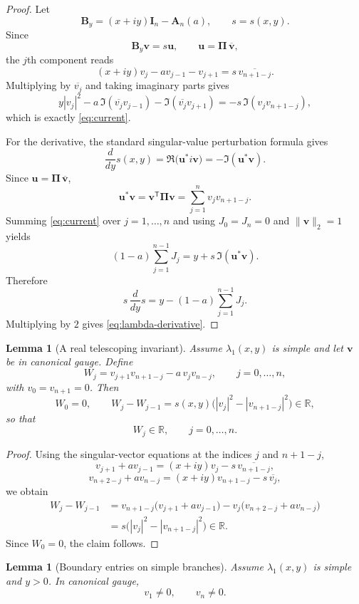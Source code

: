 \documentclass[11pt]{article}
\numberwithin{equation}{section}
\newtheorem{lemma}[theorem]{Lemma}
\begin{document}
\begin{proof}
Let
\[
\mathbf B_y=(x+iy)\mathbf I_n-\mathbf A_n(a),
\qquad
s=s(x,y).
\]
Since
\[
\mathbf B_y\bm v=s\bm u,
\qquad
\bm u=\bm{\Pi}\,\overline{\bm v},
\]
the $j$th component reads
\[
(x+iy)v_j-av_{j-1}-v_{j+1}
=
s\,\overline{v_{n+1-j}}.
\]
Multiplying by $\overline{v_j}$ and taking imaginary parts gives
\[
y|v_j|^2-a\,\Im(\overline{v_j}v_{j-1})-\Im(\overline{v_j}v_{j+1})
=
-s\,\Im(v_jv_{n+1-j}),
\]
which is exactly \eqref{eq:current}.

For the derivative, the standard singular-value perturbation formula gives
\[
\frac{d}{dy}s(x,y)
=
\Re\!\bigl(\bm u^* i\bm v\bigr)
=
-\Im(\bm u^*\bm v).
\]
Since $\bm u=\bm{\Pi}\,\overline{\bm v}$,
\[
\bm u^*\bm v
=
\bm v^{\mathsf T}\bm{\Pi}\bm v
=
\sum_{j=1}^n v_jv_{n+1-j}.
\]
Summing \eqref{eq:current} over $j=1,\dots,n$ and using $J_0=J_n=0$ and
$\|\bm v\|_2=1$ yields
\[
(1-a)\sum_{j=1}^{n-1}J_j
=
y+s\,\Im(\bm u^*\bm v).
\]
Therefore
\[
s\,\frac{d}{dy}s
=
y-(1-a)\sum_{j=1}^{n-1}J_j.
\]
Multiplying by $2$ gives \eqref{eq:lambda-derivative}.
\end{proof}

\begin{lemma}[A real telescoping invariant]\label{lem:W}
Assume $\lambda_1(x,y)$ is simple and let $\bm v$ be in canonical gauge.
Define
\[
W_j=v_{j+1}v_{n+1-j}-a\,v_jv_{n-j},
\qquad
j=0,\dots,n,
\]
with $v_0=v_{n+1}=0$.  Then
\[
W_0=0,
\qquad
W_j-W_{j-1}
=
s(x,y)\bigl(|v_j|^2-|v_{n+1-j}|^2\bigr)\in\mathbb{R},
\]
so that
\[
W_j\in\mathbb{R},\qquad j=0,\dots,n.
\]
\end{lemma}

\begin{proof}
Using the singular-vector equations at the indices $j$ and $n+1-j$,
\[
v_{j+1}+av_{j-1}=(x+iy)v_j-s\,\overline{v_{n+1-j}},
\]
\[
v_{n+2-j}+av_{n-j}=(x+iy)v_{n+1-j}-s\,\overline{v_j},
\]
we obtain
\begin{align*}
W_j-W_{j-1}
&=
v_{n+1-j}\bigl(v_{j+1}+av_{j-1}\bigr)
-
v_j\bigl(v_{n+2-j}+av_{n-j}\bigr) \\
&=
s\bigl(|v_j|^2-|v_{n+1-j}|^2\bigr)\in\mathbb{R}.
\end{align*}
Since $W_0=0$, the claim follows.
\end{proof}

\begin{lemma}[Boundary entries on simple branches]\label{lem:boundary}
Assume $\lambda_1(x,y)$ is simple and $y>0$.  In canonical gauge,
\[
v_1\neq0,
\qquad
v_n\neq0.
\]
\end{lemma}
\end{document}
